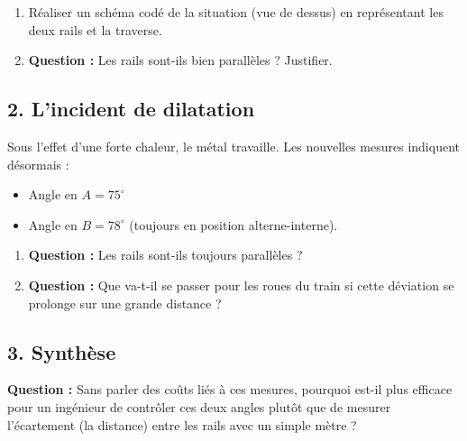 \documentclass[a4paper]{book}
\begin{document}
{\begin{exercice}
        \begin{enumerate}
            \item Réaliser un schéma codé de la situation (vue de dessus) en représentant les deux rails et la traverse.
            \item \textbf{Question :} Les rails sont-ils bien parallèles ? Justifier.
        \end{enumerate}
        
        \subsection*{2. L'incident de dilatation}
        Sous l'effet d'une forte chaleur, le métal travaille. Les nouvelles mesures indiquent désormais :
        \begin{itemize}
            \item Angle en $A = 75^\circ$
            \item Angle en $B = 78^\circ$ (toujours en position alterne-interne).
        \end{itemize}
        
        \begin{enumerate}
            \item \textbf{Question :} Les rails sont-ils toujours parallèles ? 
            \item \textbf{Question :} Que va-t-il se passer pour les roues du train si cette déviation se prolonge sur une grande distance ?
        \end{enumerate}
        
        \subsection*{3. Synthèse}
        \textbf{Question :} Sans parler des coûts liés à ces mesures, pourquoi est-il plus efficace pour un ingénieur de contrôler ces deux angles plutôt que de mesurer l'écartement (la distance) entre les rails avec un simple mètre ?
    \end{exercice}

}
\end{document}
